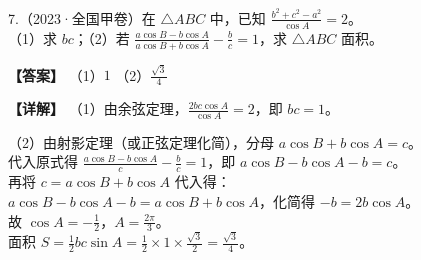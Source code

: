 \documentclass[UTF8,10pt,aspectratio=169]{ctexbeamer}
\begin{document}
	\begin{frame}
		7.（2023·全国甲卷）在 $\triangle ABC$ 中，已知 $\frac{b^2+c^2-a^2}{\cos A} = 2$。\\
		（1）求 $bc$；\quad （2）若 $\frac{a\cos B - b\cos A}{a\cos B + b\cos A} - \frac{b}{c} = 1$，求 $\triangle ABC$ 面积。
		
		\vspace{0.3cm}
		\pause
		\textbf{【答案】} （1）$1$ \quad （2）$\frac{\sqrt{3}}{4}$
		
		\vspace{0.2cm}
		\textbf{【详解】} 
		（1）由余弦定理，$\frac{2bc\cos A}{\cos A} = 2$，即 $bc = 1$。
		
		（2）由射影定理（或正弦定理化简），分母 $a\cos B + b\cos A = c$。\\
		代入原式得 $\frac{a\cos B - b\cos A}{c} - \frac{b}{c} = 1$，即 $a\cos B - b\cos A - b = c$。\\
		再将 $c = a\cos B + b\cos A$ 代入得：\\
		$a\cos B - b\cos A - b = a\cos B + b\cos A$，化简得 $-b = 2b\cos A$。\\
		故 $\cos A = -\frac{1}{2}$，$A = \frac{2\pi}{3}$。\\
		面积 $S = \frac{1}{2}bc\sin A = \frac{1}{2} \times 1 \times \frac{\sqrt{3}}{2} = \frac{\sqrt{3}}{4}$。
	\end{frame}
	
\end{document}
